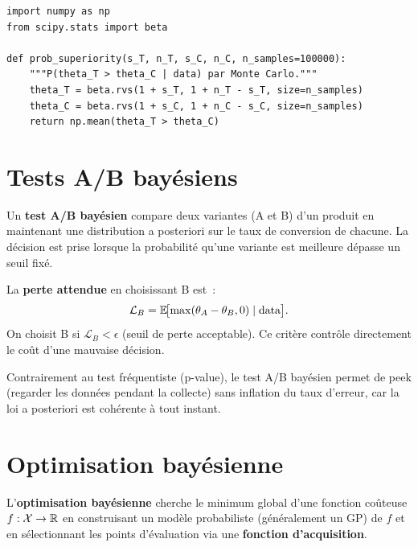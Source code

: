 \begin{verbatim}
import numpy as np
from scipy.stats import beta

def prob_superiority(s_T, n_T, s_C, n_C, n_samples=100000):
    """P(theta_T > theta_C | data) par Monte Carlo."""
    theta_T = beta.rvs(1 + s_T, 1 + n_T - s_T, size=n_samples)
    theta_C = beta.rvs(1 + s_C, 1 + n_C - s_C, size=n_samples)
    return np.mean(theta_T > theta_C)
\end{verbatim}

\section{Tests A/B bay\'esiens}

\begin{definition}
Un \textbf{test A/B bay\'esien} compare deux variantes (A et B) d'un
produit en maintenant une distribution a posteriori sur le taux de
conversion de chacune. La d\'ecision est prise lorsque la probabilit\'e
qu'une variante est meilleure d\'epasse un seuil fix\'e.
\end{definition}

\begin{proposition}
La \textbf{perte attendue} en choisissant B est~:
\[
  \mathcal{L}_B = \mathbb{E}\!\bigl[\max(\theta_A - \theta_B, 0) \mid \text{data}\bigr].
\]
On choisit B si $\mathcal{L}_B < \epsilon$ (seuil de perte acceptable).
Ce crit\`ere contr\^ole directement le co\^ut d'une mauvaise d\'ecision.
\end{proposition}

\begin{attention}
Contrairement au test fr\'equentiste (p-value), le test A/B bay\'esien
permet de \og peek \fg (regarder les donn\'ees pendant la collecte)
sans inflation du taux d'erreur, car la loi a posteriori est
coh\'erente \`a tout instant.
\end{attention}

\section{Optimisation bay\'esienne}

\begin{definition}
L'\textbf{optimisation bay\'esienne} cherche le minimum global d'une
fonction co\^uteuse $f : \mathcal{X} \to \mathbb{R}$ en construisant un mod\`ele
probabiliste (g\'en\'eralement un GP) de $f$ et en s\'electionnant les
points d'\'evaluation via une \textbf{fonction d'acquisition}.
\end{definition}

